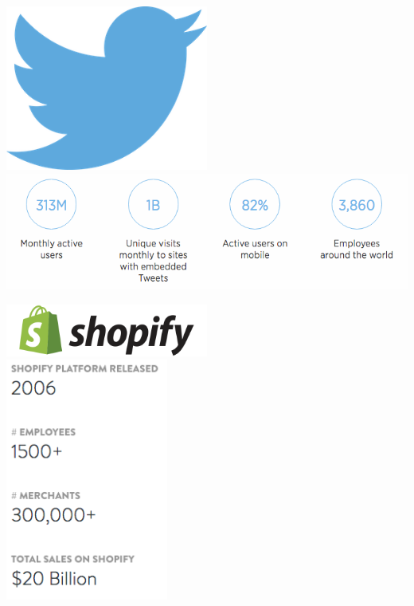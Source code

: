 \documentclass{beamer}
\begin{document}
\begin{frame}[plain]
  \begin{center}
      \includegraphics[width=0.5\textwidth]{img/twitter-logo.png} \\
      \includegraphics[width=\textwidth]{img/twitter-stats.png} \\
  \end{center}
\end{frame}

\begin{frame}[plain]
  \begin{center}
      \includegraphics[width=0.5\textwidth]{img/shopify-logo.png} \\

      \includegraphics[width=0.4\textwidth]{img/shopify-stats.png}
  \end{center}
\end{frame}
\end{document}
